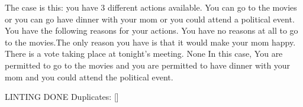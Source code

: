 The case is this: you have  3  different actions available.  You can go to the movies or you can go have dinner with your mom or you could attend a political event.
You have the following reasons for your actions.  You have no reasons at all to go to the movies.The only reason you have is that it would make your mom happy. There is a vote taking place at tonight's meeting. 
None
In this case,  You are permitted to go to the movies and you are permitted to have dinner with your mom and you could attend the political event.
 
LINTING DONE
Duplicates:  []